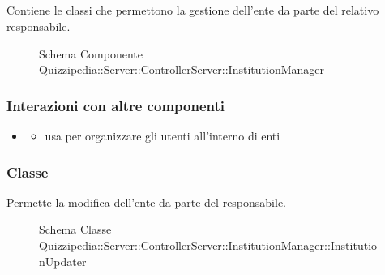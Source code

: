 \subsection{}
Contiene le classi che permettono la gestione dell'ente da parte del relativo responsabile.
\begin{figure}[H]
\centering
\noindent{}
\caption[Schema Componente Quizzipedia::Server::ControllerServer::InstitutionManager]{Schema Componente Quizzipedia::Server::ControllerServer::InstitutionManager}
\end{figure}
\subsubsection{Interazioni con altre componenti}
\begin{itemize}
\item {}
\begin{itemize}
\item usa  per organizzare gli utenti all'interno di enti
\end{itemize}
\end{itemize}
\subsubsection{Classe }
Permette la modifica dell'ente da parte del responsabile.
\begin{figure}[H]
\centering
\noindent{}
\caption[Schema Classe InstitutionUpdater]{Schema Classe Quizzipedia::Server::ControllerServer::InstitutionManager::InstitutionUpdater}
\end{figure}
